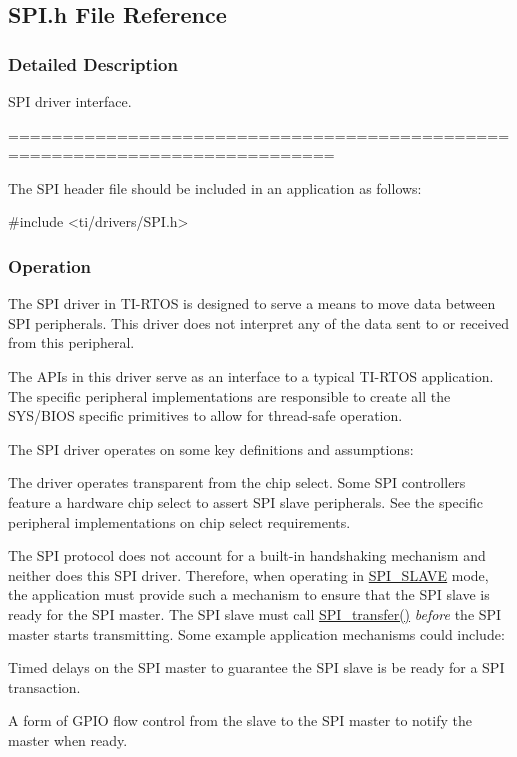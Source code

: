 \subsection{S\+P\+I.\+h File Reference}
\label{_s_p_i_8h}


\subsubsection{Detailed Description}
S\+P\+I driver interface. 

============================================================================

The S\+P\+I header file should be included in an application as follows\+: 
\begin{DoxyCode}
\textcolor{preprocessor}{#include <ti/drivers/SPI.h>}
\end{DoxyCode}


\subsubsection*{Operation}

The S\+P\+I driver in T\+I-\/\+R\+T\+O\+S is designed to serve a means to move data between S\+P\+I peripherals. This driver does not interpret any of the data sent to or received from this peripheral.

The A\+P\+Is in this driver serve as an interface to a typical T\+I-\/\+R\+T\+O\+S application. The specific peripheral implementations are responsible to create all the S\+Y\+S/\+B\+I\+O\+S specific primitives to allow for thread-\/safe operation.

The S\+P\+I driver operates on some key definitions and assumptions\+:
\begin{DoxyItemize}
\item The driver operates transparent from the chip select. Some S\+P\+I controllers feature a hardware chip select to assert S\+P\+I slave peripherals. See the specific peripheral implementations on chip select requirements.
\item The S\+P\+I protocol does not account for a built-\/in handshaking mechanism and neither does this S\+P\+I driver. Therefore, when operating in \hyperlink{_s_p_i_8h_a60a7e3d74577b38aa79ea6983362f942abc98c1546fe12d3fceb1f86cf670faa9}{S\+P\+I\+\_\+\+S\+L\+A\+V\+E} mode, the application must provide such a mechanism to ensure that the S\+P\+I slave is ready for the S\+P\+I master. The S\+P\+I slave must call \hyperlink{_s_p_i_8h_a989e17f96b54fcc3dc2cac5f8ac6bdb2}{S\+P\+I\+\_\+transfer()} {\itshape before} the S\+P\+I master starts transmitting. Some example application mechanisms could include\+:
\begin{DoxyItemize}
\item Timed delays on the S\+P\+I master to guarantee the S\+P\+I slave is be ready for a S\+P\+I transaction.
\item A form of G\+P\+I\+O flow control from the slave to the S\+P\+I master to notify the master when ready.
\end{DoxyItemize}
\end{DoxyItemize}

